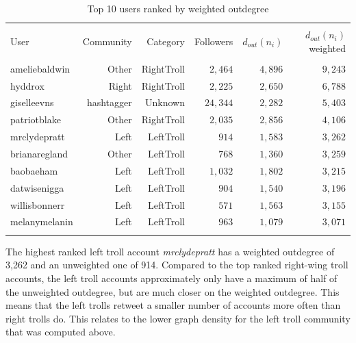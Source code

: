 \documentclass[12pt, titlepage=true, toc=bib]{scrartcl}
\begin{document}
\begin{table}[!ht] \centering 
\begin{tabular*}{.95\linewidth}{@{\extracolsep{\fill}} lrrrrr} 
\\[-1.8ex]\hline 
\hline \\[-1.8ex] 
User & Community & Category & Followers & \( d_{out}(n_{i}) \) & \( d_{out}(n_{i}) \) weighted \\ 
\hline \\[-1.8ex] 
ameliebaldwin & Other & RightTroll & $2,464$ & $4,896$ & $9,243$ \\ 
hyddrox & Right & RightTroll & $2,225$ & $2,650$ & $6,788$ \\ 
giselleevns & hashtagger & Unknown & $24,344$ & $2,282$ & $5,403$ \\ 
patriotblake & Other & RightTroll & $2,035$ & $2,856$ & $4,106$ \\ 
mrclydepratt & Left & LeftTroll & $914$ & $1,583$ & $3,262$ \\ 
brianaregland & Other & LeftTroll & $768$ & $1,360$ & $3,259$ \\ 
baobaeham & Left & LeftTroll & $1,032$ & $1,802$ & $3,215$ \\ 
datwisenigga & Left & LeftTroll & $904$ & $1,540$ & $3,196$ \\ 
willisbonnerr & Left & LeftTroll & $571$ & $1,563$ & $3,155$ \\ 
melanymelanin & Left & LeftTroll & $963$ & $1,079$ & $3,071$ \\ 
\hline \\[-1.8ex] 
\end{tabular*} 
  \caption[Outdegree weighted]{Top 10 users ranked by weighted outdegree} 
  \label{tab:wout} 
\end{table} 

The highest ranked left troll account \textit{mrclydepratt} has a weighted outdegree of 3,262 and an unweighted one of 914. Compared to the top ranked right-wing troll accounts, the left troll accounts approximately only have a maximum of half of the unweighted outdegree, but are much closer on the weighted outdegree. This means that the left trolls retweet a smaller number of accounts more often than right trolls do. This relates to the lower graph density for the left troll community that was computed above.
\end{document}
